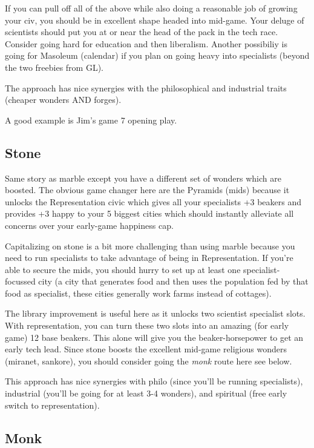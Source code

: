 \documentclass[10pt]{article}
\begin{document}
If you can pull off all of the above while also doing a reasonable job
of growing your civ, you should be in excellent shape headed into
mid-game. Your deluge of scientists should put you at or near the head
of the pack in the tech race. Consider going hard for education and
then liberalism. Another possibiliy is going for Masoleum (calendar)
if you plan on going heavy into specialists (beyond the two freebies
from GL).

The approach has nice synergies with the philosophical and industrial traits (cheaper wonders AND forges).

A good example is Jim's game 7 opening play.

\subsection*{Stone}

Same story as marble except you have a different set of wonders which
are boosted. The obvious game changer here are the Pyramids (mids)
because it unlocks the Representation civic which gives all your
specialists +3 beakers and provides +3 happy to your 5 biggest cities
which should instantly alleviate all concerns over your early-game
happiness cap.

Capitalizing on stone is a bit more challenging than using marble
because you need to run specialists to take advantage of being in
Representation. If you're able to secure the mids, you should hurry to
set up at least one specialist-focussed city (a city that generates
food and then uses the population fed by that food as specialist,
these cities generally work farms instead of cottages).

The library improvement is useful here as it unlocks two scientist
specialist slots. With representation, you can turn these two slots
into an amazing (for early game) 12 base beakers. This alone will give
you the beaker-horsepower to get an early tech lead. Since stone
boosts the excellent mid-game religious wonders (miranet, sankore),
you should consider going the \emph{monk} route here see below.

This approach has nice synergies with philo (since you'll be running
specialists), industrial (you'll be going for at least 3-4 wonders),
and spiritual (free early switch to representation).

\subsection*{Monk}
\end{document}
